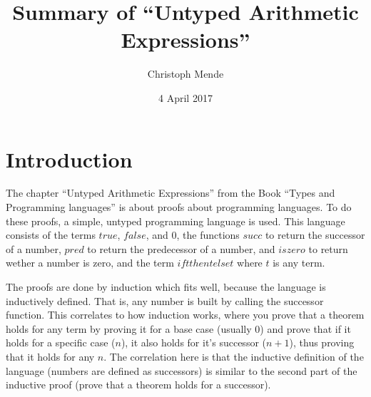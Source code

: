 \documentclass[acmlarge]{acmart}
\begin{document}
\title{Summary of ``Untyped Arithmetic Expressions''}
\author{Christoph Mende}
\date{4 April 2017}
\maketitle

\section{Introduction}

The chapter ``Untyped Arithmetic Expressions'' from the Book ``Types and Programming languages''\cite{Pierce:2002:TPL:509043} is about proofs about programming languages. To do these proofs, a simple, untyped programming language is used. This language consists of the terms $true$, $false$, and $0$, the functions $succ$ to return the successor of a number, $pred$ to return the predecessor of a number, and $iszero$ to return wether a number is zero, and the term $if t then t else t$ where $t$ is any term.

The proofs are done by induction which fits well, because the language is inductively defined. That is, any number is built by calling the successor function. This correlates to how induction works, where you prove that a theorem holds for any term by proving it for a base case (usually $0$) and prove that if it holds for a specific case ($n$), it also holds for it's successor ($n+1$), thus proving that it holds for any $n$. The correlation here is that the inductive definition of the language (numbers are defined as successors) is similar to the second part of the inductive proof (prove that a theorem holds for a successor).







\end{document}
